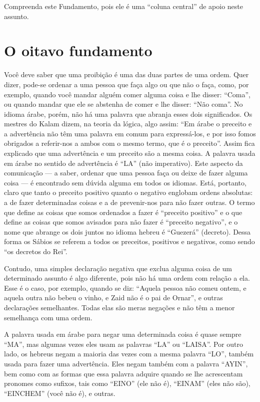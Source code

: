 Compreenda este Fundamento, pois ele é uma ``coluna central'' de apoio
neste assunto.


\chapter*{O oitavo fundamento}

Você deve saber que uma proibição é uma das duas partes de uma ordem.
Quer dizer, pode-se ordenar a uma pessoa que faça algo ou que não o
faça, como, por exemplo, quando você mandar alguém comer alguma coisa e
lhe disser: ``Coma'', ou quando mandar que ele se abstenha de comer e
lhe disser: ``Não coma''. No idioma árabe, porém, não há uma palavra que
abranja esses dois significados. Os mestres do Kalam dizem, na teoria da
lógica, algo assim: ``Em árabe o preceito e a advertência não têm uma
palavra em comum para expressá-los, e por isso fomos obrigados a
referir-nos a ambos com o mesmo termo, que é o preceito''. Assim fica
explicado que uma advertência e um preceito são a mesma coisa. A palavra
usada em árabe no sentido de advertência é ``LA'' (não imperativo).
Este aspecto da comunicação --- a saber, ordenar que uma pessoa faça ou
deixe de fazer alguma coisa --- é encontrado sem dúvida alguma em todos
os idiomas. Está, portanto, claro que tanto o preceito positivo quanto
o negativo englobam ordens absolutas: a de fazer determinadas coisas e
a de prevenir-nos para não fazer outras. O termo que define as coisas
que somos ordenados a fazer é ``preceito positivo'' e o que define as
coisas que somos avisados para não fazer é ``preceito negativo'', e o
nome que abrange os dois juntos no idioma hebreu é ``Guezerá''
(decreto). Dessa forma os Sábios se referem a todos os preceitos,
positivos e negativos, como sendo ``os decretos do Rei''.

Contudo, uma simples declaração negativa que exclua alguma coisa de um
determinado assunto é algo diferente, pois não há uma ordem com relação
a ela. Esse é o caso, por exemplo, quando se diz: ``Aquela pessoa não
comeu ontem, e aquela outra não bebeu o vinho, e Zaid não é o pai de
Ornar'', e outras declarações semelhantes. Todas elas são meras negações
e não têm a menor semelhança com uma ordem.

A palavra usada em árabe para negar uma determinada coisa é quase sempre
``MA'', mas algumas vezes eles usam as palavras ``LA'' ou ``LAISA''. Por
outro lado, os hebreus negam a maioria das vezes com a mesma palavra
``LO'', também usada para fazer uma advertência. Eles negam também com a
palavra ``AYIN'', bem como com as formas que essa palavra adquire quando
se lhe acrescentam pronomes como sufixos, tais como ``EINO'' (ele não
é), ``EINAM'' (eles não são), ``EINCHEM'' (você não é), e outras.

